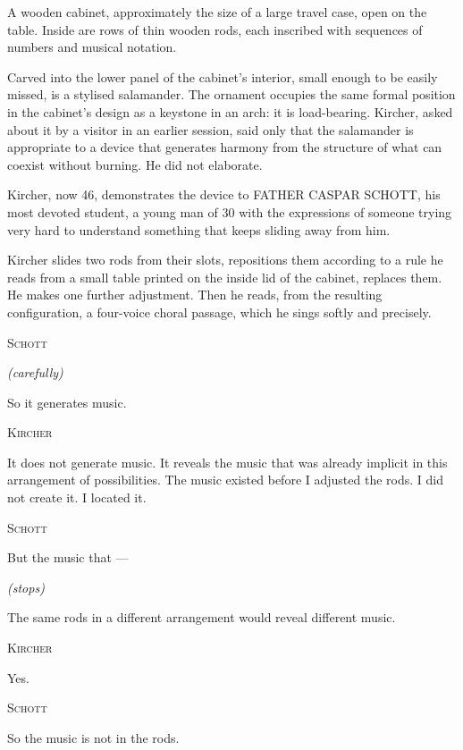 \documentclass[12pt, a4paper, twoside]{memoir}
\theoremstyle{definition}
\theoremstyle{remark}
\newenvironment{action}{%
  \vspace{4pt}%
  \noindent\begin{minipage}{\linewidth}%
  \setlength{\parindent}{0pt}%
  \itshape\color{kircherink}%
}{%
  \end{minipage}\vspace{6pt}%
}
\newenvironment{dialogue}[1]{%
  \vspace{6pt}%
  \noindent\hspace{24mm}%
  \begin{minipage}{0.6\linewidth}%
  \begin{center}%
  {\small\textsc{#1}}%
  \end{center}%
  \vspace{2pt}%
}{%
  \end{minipage}\vspace{6pt}%
}
\newcommand{\paren}[1]{%
  \begin{center}%
  \small\itshape\color{plaguegrey}(#1)%
  \end{center}%
}
\newcommand{\salamander}[1]{%
  \marginnote{\color{arkgold!80}\scriptsize\bfseries[S\,#1]}%
}
\begin{document}
\begin{action}
A wooden cabinet, approximately the size of a large travel case, open on the table. Inside are rows of thin wooden rods, each inscribed with sequences of numbers and musical notation.

\salamander{II} Carved into the lower panel of the cabinet's interior, small enough to be easily missed, is a stylised salamander. The ornament occupies the same formal position in the cabinet's design as a keystone in an arch: it is load-bearing. Kircher, asked about it by a visitor in an earlier session, said only that the salamander is appropriate to a device that generates harmony from the structure of what can coexist without burning. He did not elaborate.

Kircher, now 46, demonstrates the device to FATHER CASPAR SCHOTT, his most devoted student, a young man of 30 with the expressions of someone trying very hard to understand something that keeps sliding away from him.

Kircher slides two rods from their slots, repositions them according to a rule he reads from a small table printed on the inside lid of the cabinet, replaces them. He makes one further adjustment. Then he reads, from the resulting configuration, a four-voice choral passage, which he sings softly and precisely.
\end{action}

\begin{dialogue}{Schott}
\paren{carefully}
So it generates music.
\end{dialogue}

\begin{dialogue}{Kircher}
It does not generate music. It reveals the music that was already implicit in this arrangement of possibilities. The music existed before I adjusted the rods. I did not create it. I located it.
\end{dialogue}

\begin{dialogue}{Schott}
But the music that --- \paren{stops} The same rods in a different arrangement would reveal different music.
\end{dialogue}

\begin{dialogue}{Kircher}
Yes.
\end{dialogue}

\begin{dialogue}{Schott}
So the music is not in the rods.
\end{dialogue}
\end{document}
